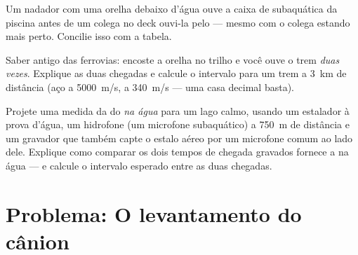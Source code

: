 \begin{exercise}[$\star\star$]\label{exo:g7:sound-production:10}
Um nadador com uma orelha debaixo d'água ouve a caixa de 
subaquática da piscina antes de um colega no deck ouvi-la pelo  ---
mesmo com o colega estando mais perto. Concilie isso com a tabela.
\end{exercise}

\begin{exercise}[$\star\star$]\label{exo:g7:sound-production:11}
Saber antigo das ferrovias: encoste a orelha no trilho e você ouve o
trem \emph{duas vezes}. Explique as duas chegadas e calcule o
intervalo para um trem a \qty{3}{km} de distância (aço a
\qty{5000}{m/s},  a \qty{340}{m/s} --- uma casa decimal basta).
\end{exercise}

\begin{exercise}[$\star\star\star$]\label{exo:g7:sound-production:12}
Projete uma medida da  do  \emph{na água} para um lago
calmo, usando um estalador à prova d'água, um hidrofone (um microfone
subaquático) a \qty{750}{m} de distância e um gravador que também
capte o estalo aéreo por um microfone comum ao lado dele. Explique
como comparar os dois tempos de chegada gravados fornece a 
na água --- e calcule o intervalo esperado entre as duas chegadas.
\end{exercise}

\section{Problema: O levantamento do cânion}

